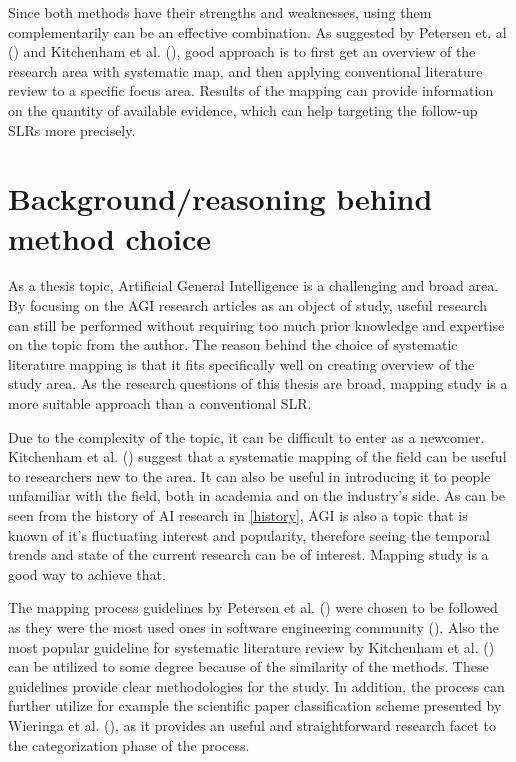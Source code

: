 \documentclass[utf8,english]{gradu3}
\begin{document}
Since both methods have their strengths and weaknesses, using them
complementarily can be an effective combination. As suggested by Petersen et. al
(\cite*{petersen2008}) and Kitchenham et al. (\cite{kitchenham2010}), good
approach is to first get an overview of the research area with systematic map,
and then applying conventional literature review to a specific focus area.
Results of the mapping can provide information on the quantity of available
evidence, which can help targeting the follow-up SLRs more precisely.


\section{Background/reasoning behind method choice}

As a thesis topic, Artificial General Intelligence is a challenging and broad
area. By focusing on the AGI research articles as an object of study, useful
research can still be performed without requiring too much prior knowledge and
expertise on the topic from the author. The reason behind the choice of
systematic literature mapping is that it fits specifically well on creating
overview of the study area. As the research questions of this thesis are broad,
mapping study is a more suitable approach than a conventional SLR.

Due to the complexity of the topic, it can be difficult to enter as a newcomer.
Kitchenham et al. (\cite*{kitchenham2010}) suggest that a systematic mapping of
the field can be useful to researchers new to the area.  It can also be useful
in introducing it to people unfamiliar with the field, both in academia and on
the industry's side. As can be seen from the history of AI research in
\ref{history}, AGI is also a topic that is known of it's fluctuating interest
and popularity, therefore seeing the temporal trends and state of the current
research can be of interest. Mapping study is a good way to achieve that.

The mapping process guidelines by Petersen et al.
(\cite*{petersen2008,petersen2015}) were chosen to be followed as they were the
most used ones in software engineering community (\cite{petersen2015}). Also the
most popular guideline for systematic literature review by Kitchenham et al.
(\cite*{kitchenham2007}) can be utilized to some degree because of the similarity
of the methods. These guidelines provide clear methodologies for the study. In
addition, the process can further utilize for example the scientific paper
classification scheme presented by Wieringa et al. (\cite{wieringa2006}), as it
provides an useful and straightforward research facet to the categorization
phase of the process.
\end{document}
